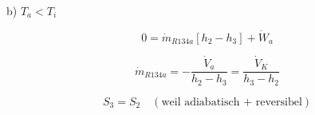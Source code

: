 b) \( T_a < T_i \)

\[
0 = \dot{m}_{R134a} \left[ h_2 - h_3 \right] + \dot{W}_a
\]

\[
\dot{m}_{R134a} = -\frac{\dot{V}_a}{h_2 - h_3} = \frac{\dot{V}_K}{h_3 - h_2}
\]

\[
S_3 = S_2 \quad (\text{weil adiabatisch + reversibel})
\]